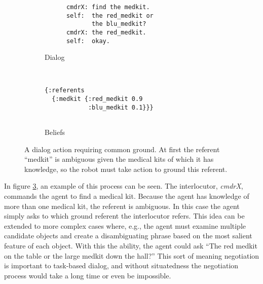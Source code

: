 \documentclass[12pt]{article}
\begin{document}
\begin{figure}[h]
  \centering
  \begin{subfigure}{0.4\textwidth}
    \centering
\begin{verbatim}
      cmdrX: find the medkit.
      self:  the red_medkit or
             the blu_medkit?
      cmdrX: the red_medkit.
      self:  okay.
\end{verbatim}    
    \label{fig:cg_text}
    \caption{Dialog}
  \end{subfigure}
  ~\qquad\qquad
  \begin{subfigure}{0.4\textwidth}
    \centering
\begin{verbatim}
{:referents
  {:medkit {:red_medkit 0.9 
            :blu_medkit 0.1}}}


\end{verbatim}
    \label{fig:cg_beliefs}
    \caption{Beliefs}
  \end{subfigure}
  \caption{A dialog action requiring common ground. At first the
    referent ``medkit'' is ambiguous given the medical kits of which
    it has knowledge, so the robot must take action to ground this
    referent.}
  \label{fig:cg}
\end{figure}

In figure \ref{fig:cg}, an example of this process can be seen. The
interlocutor, \textit{cmdrX}, commands the agent to find a medical
kit. Because the agent has knowledge of more than one medical kit, the
referent is ambiguous. In this case the agent simply asks to which
ground referent the interlocutor refers. This idea can be extended to
more complex cases where, e.g., the agent must examine multiple
candidate objects and create a disambiguating phrase based on the most
salient feature of each object. With this the ability, the agent could
ask ``The red medkit on the table or the large medkit down the hall?''
This sort of meaning negotiation is important to task-based dialog,
and without situatedness the negotiation process would take a long
time or even be impossible.
\end{document}
